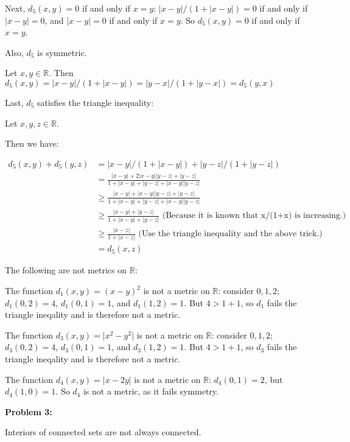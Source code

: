 \documentclass[a4paper,12pt]{article}
\newcommand{\tab}{\hspace{4mm}} %
\newcommand{\shunt}{\vspace{20mm}}
\newcommand{\absval}[1]{\lvert #1 \rvert}
\newcommand{\R}{\mathbb{R}}
\begin{document}
\tab Next, $d_5(x,y) = 0$ if and only if $x=y$: $\absval{x-y}/(1+\absval{x-y}) = 0$ if and only if $\absval{x-y} = 0$, and $\absval{x-y}=0$ if and only if $x=y$. So $d_5(x,y) = 0$ if and only if $x=y$.

\tab Also, $d_5$ is symmetric.

\tab \tab Let $x,y \in \R$. Then $d_5(x,y)= \absval{x-y}/(1+\absval{x-y}) = \absval{y-x}/(1+\absval{y-x})=d_5(y,x)$

\tab Last, $d_5$ satisfies the triangle inequality:

\tab \tab Let $x,y,z \in \R$.

\tab \tab Then we have:

\begin{align*}
d_5(x,y) +d_5(y,z) &= \absval{x-y}/(1+\absval{x-y}) + \absval{y-z}/(1+\absval{y-z}) \\
&= \frac{\absval{x-y}+2\absval{x-y}\absval{y-z} + \absval{y-z}}{1+\absval{x-y}+\absval{y-z}+\absval{x-y}\absval{y-z}}\\
&\geq \frac{\absval{x-y}+\absval{x-y}\absval{y-z} + \absval{y-z}}{1+\absval{x-y}+\absval{y-z}+\absval{x-y}\absval{y-z}}\\
&\geq \frac{\absval{x-y} + \absval{y-z}}{1+\absval{x-y}+\absval{y-z}} \text{ (Because it is known that x/(1+x) is increasing.)}\\
&\geq \frac{\absval{x-z}}{1+\absval{x-z}} \text{ (Use the triangle inequality and the above trick.)} \\
&=d_5(x,z)
\end{align*}

The following are not metrics on $\R$:

The function $d_1(x,y) = (x-y)^2$ is not a metric on $\R$: consider $0,1,2$; $d_1(0,2) = 4$, $d_1(0,1) = 1$, and $d_1(1,2) = 1$. But $4 > 1+1$, so $d_1$ fails the triangle ineqality and is therefore not a metric.

The function $d_3(x,y) = \absval{x^2-y^2}$ is not a metric on $\R$: consider $0,1,2$; $d_3(0,2) = 4$, $d_3(0,1) = 1$, and $d_3(1,2) = 1$. But $4 > 1+1$, so $d_3$ fails the triangle ineqality and is therefore not a metric. 

The function $d_4(x,y) = \absval{x -2y}$ is not a metric on $\R$: $d_4(0,1) = 2$, but $d_4(1,0) = 1$. So $d_4$ is not a metric, as it fails symmetry.

\shunt

{\bf Problem 3:}

Interiors of connected sets are not always connected.
\end{document}

